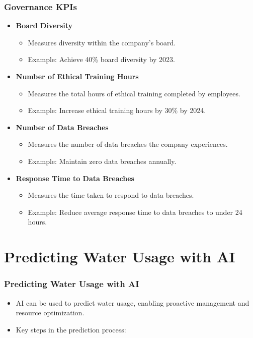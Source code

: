 \documentclass{beamer}
\begin{document}
\begin{frame}
\frametitle{Governance KPIs}
\begin{itemize}
    \item \textbf{Board Diversity}
        \begin{itemize}
            \item Measures diversity within the company's board.
            \item Example: Achieve 40\% board diversity by 2023.
        \end{itemize}
    \item \textbf{Number of Ethical Training Hours}
        \begin{itemize}
            \item Measures the total hours of ethical training completed by employees.
            \item Example: Increase ethical training hours by 30\% by 2024.
        \end{itemize}
    \item \textbf{Number of Data Breaches}
        \begin{itemize}
            \item Measures the number of data breaches the company experiences.
            \item Example: Maintain zero data breaches annually.
        \end{itemize}
    \item \textbf{Response Time to Data Breaches}
        \begin{itemize}
            \item Measures the time taken to respond to data breaches.
            \item Example: Reduce average response time to data breaches to under 24 hours.
        \end{itemize}
\end{itemize}
\end{frame}

\section{Predicting Water Usage with AI}

\begin{frame}
\frametitle{Predicting Water Usage with AI}
\begin{itemize}
    \item AI can be used to predict water usage, enabling proactive management and resource optimization.
    \item Key steps in the prediction process:
\end{itemize}
\end{frame}
\end{document}
